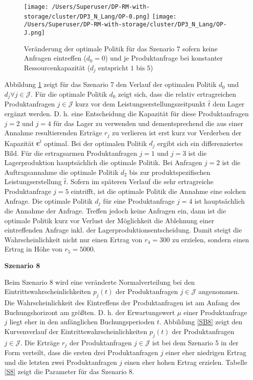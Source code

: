 \begin{figure}[h!]     
\begin{center}
\texttt{[image: /Users/Superuser/DP-RM-with-storage/cluster/DP3\_N\_Lang/OP-0.png]}
\texttt{[image: /Users/Superuser/DP-RM-with-storage/cluster/DP3\_N\_Lang/OP-J.png]}
    \caption{Veränderung der optimale Politik für das Szenario 7 sofern keine Anfragen eintreffen ($d_0=0$) und je Produktanfrage bei konstanter Ressourcenkapazität ($d_j\text{ entspricht }1\text{ bis }5$)}  \label{SV7}
  \end{center}
\end{figure}

Abbildung \ref{SV7} zeigt für das Szenario 7 den Verlauf der optimalen Politik $d_0$ und $d_j\forall j\in\mathcal{J}$. Für die optimale Politik $d_0$ zeigt sich, dass die relativ ertragreichen Produktanfragen $j\in\mathcal{J}$ kurz vor dem Leistungserstellungszeitpunkt $\hat t$ dem Lager ergänzt werden. D. h. eine Entscheidung die Kapazität für diese Produktanfragen $j=2$ und $j=4$ für das Lager zu verwenden und dementsprechend die aus einer Annahme resultierenden Erträge $r_j$ zu verlieren ist erst kurz vor Verderben der Kapazität $\textbf{c}^{\hat t}$ optimal. Bei der optimalen Politik $d_j$ ergibt sich ein differenziertes Bild. Für die ertragsarmen Produktanfragen $j=1$ und $j=3$ ist die Lagerproduktion hauptsächlich die optimale Politik. Bei Anfragen $j=2$ ist die Auftragsannahme die optimale Politik $d_2$ bis zur produktspezifischen Leistungserstellung $\hat t$. Sofern im späteren Verlauf die sehr ertragreiche Produktanfrage $j=5$ eintrifft, ist die optimale Politik die Annahme eine solchen Anfrage. Die optimale Politik $d_j$ für eine Produktanfrage $j=4$ ist hauptsächlich die Annahme der Anfrage. Treffen jedoch keine Anfragen ein, dann ist die optimale Politik kurz vor Verlust der Möglichkeit die Ablehnung einer eintreffenden Anfrage inkl. der Lagerproduktionsentscheidung. Damit steigt die Wahrscheinlichkeit nicht nur einen Ertrag von $r_4=300$ zu erzielen, sondern einen Ertrag in Höhe von $r_5=5000$.

\textbf{Szenario 8}

Beim Szenario 8 wird eine veränderte Normalverteilung bei den Eintrittswahrscheinlichkeiten $p_j(t)$ der Produktanfragen $j\in\mathcal{J}$ angenommen. Die Wahrscheinlichkeit des Eintreffens der Produktanfragen ist am Anfang des Buchungshorizont am größten. D. h. der Erwartungswert $\mu$ einer Produktanfrage $j$ liegt eher in den anfänglichen Buchungsperioden $t$. Abbildung \ref{SB8} zeigt den Kurvenverlauf der Eintrittswahrscheinlichkeiten $p_j(t)$ der Produktanfragen $j\in\mathcal{J}$. Die Erträge $r_j$ der Produktanfragen $j\in\mathcal{J}$ ist bei dem Szenario 5 in der Form verteilt, dass die ersten drei Produktanfragen $j$ einer eher niedrigen Ertrag und die letzten zwei Produktanfragen $j$ einen eher hohen Ertrag erzielen. Tabelle \ref{S8} zeigt die Parameter für das Szenario 8.

